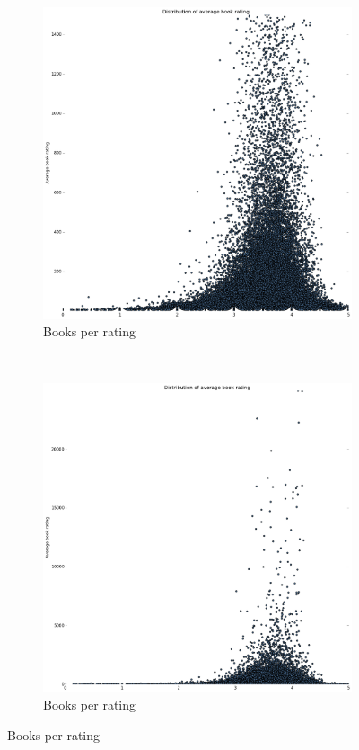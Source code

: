 \documentclass[11pt]{article}
\begin{document}
\begin{figure}
        \begin{subfigure}[b]{0.4\textwidth}
                \includegraphics[width=\textwidth]{images/book_scatter_1500}
                \caption{Books per rating}
        \end{subfigure}%
        ~ %
        \begin{subfigure}[b]{0.4\textwidth}
                \includegraphics[width=\textwidth]{images/book_scatter}
                \caption{Books per rating}
        \end{subfigure}


\end{figure}
\end{document}
